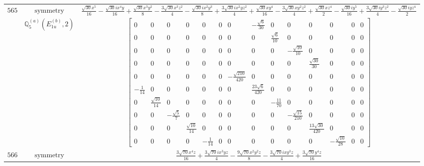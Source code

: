 \documentclass[fleqn,8pt,landscape]{jsarticle}
\begin{document}
\begin{longtable}{ccc}
$ 565 $ & $ \text{symmetry} $ & $ \frac{\sqrt{30} x^{5}}{16} - \frac{\sqrt{30} i x^{4} y}{16} + \frac{\sqrt{30} x^{3} y^{2}}{8} - \frac{3 \sqrt{30} x^{3} z^{2}}{4} - \frac{\sqrt{30} i x^{2} y^{3}}{8} + \frac{3 \sqrt{30} i x^{2} y z^{2}}{4} + \frac{\sqrt{30} x y^{4}}{16} - \frac{3 \sqrt{30} x y^{2} z^{2}}{4} + \frac{\sqrt{30} x z^{4}}{2} - \frac{\sqrt{30} i y^{5}}{16} + \frac{3 \sqrt{30} i y^{3} z^{2}}{4} - \frac{\sqrt{30} i y z^{4}}{2} $ \\
$  $ & $ \mathbb{Q}_{5}^{(a)}(E_{1u}^{(b)},2) $ & $ \begin{bmatrix} 0 & 0 & 0 & 0 & 0 & 0 & 0 & - \frac{\sqrt{6}}{30} & 0 & 0 & 0 & 0 & 0 & 0 \\ 0 & 0 & 0 & 0 & 0 & 0 & 0 & 0 & \frac{\sqrt{6}}{10} & 0 & 0 & 0 & 0 & 0 \\ 0 & 0 & 0 & 0 & 0 & 0 & 0 & 0 & 0 & - \frac{\sqrt{10}}{10} & 0 & 0 & 0 & 0 \\ 0 & 0 & 0 & 0 & 0 & 0 & 0 & 0 & 0 & 0 & \frac{\sqrt{30}}{30} & 0 & 0 & 0 \\ 0 & 0 & 0 & 0 & 0 & 0 & - \frac{\sqrt{210}}{420} & 0 & 0 & 0 & 0 & 0 & 0 & 0 \\ - \frac{1}{14} & 0 & 0 & 0 & 0 & 0 & 0 & \frac{23 \sqrt{6}}{420} & 0 & 0 & 0 & 0 & 0 & 0 \\ 0 & \frac{\sqrt{10}}{14} & 0 & 0 & 0 & 0 & 0 & 0 & - \frac{11}{70} & 0 & 0 & 0 & 0 & 0 \\ 0 & 0 & - \frac{\sqrt{5}}{7} & 0 & 0 & 0 & 0 & 0 & 0 & - \frac{\sqrt{15}}{210} & 0 & 0 & 0 & 0 \\ 0 & 0 & 0 & \frac{\sqrt{10}}{14} & 0 & 0 & 0 & 0 & 0 & 0 & \frac{13 \sqrt{30}}{420} & 0 & 0 & 0 \\ 0 & 0 & 0 & 0 & - \frac{1}{14} & 0 & 0 & 0 & 0 & 0 & 0 & - \frac{\sqrt{10}}{28} & 0 & 0 \end{bmatrix} $ \\ \hline
$ 566 $ & $ \text{symmetry} $ & $ \frac{3 \sqrt{70} x^{4} z}{16} + \frac{3 \sqrt{70} i x^{3} y z}{4} - \frac{9 \sqrt{70} x^{2} y^{2} z}{8} - \frac{3 \sqrt{70} i x y^{3} z}{4} + \frac{3 \sqrt{70} y^{4} z}{16} $ \\

\end{longtable}
\end{document}
